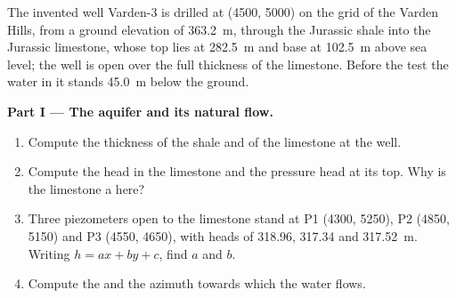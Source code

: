 \begin{problem}
\label{pb:b3:hydrogeology:1}
The invented well Varden-3 is drilled at (4500, 5000) on the grid of the
Varden Hills, from a ground elevation of \qty{363.2}{m}, through the
Jurassic shale into the Jurassic limestone, whose top lies at
\qty{282.5}{m} and base at \qty{102.5}{m} above sea level; the well is open
over the full thickness of the limestone. Before the test the water in it
stands \qty{45.0}{m} below the ground.

\medskip\noindent\textbf{Part I --- The aquifer and its natural flow.}
\begin{enumerate}
\item Compute the thickness of the shale and of the limestone at the well.
\item Compute the head in the limestone and the pressure head at its top.
  Why is the limestone a  here?
\item Three piezometers open to the limestone stand at P1 (4300, 5250), P2
  (4850, 5150) and P3 (4550, 4650), with heads of 318.96, 317.34 and
  \qty{317.52}{m}. Writing $h = ax + by + c$, find $a$ and $b$.
\item Compute the  and the azimuth towards which the
  water flows.
\end{enumerate}


\end{problem}
